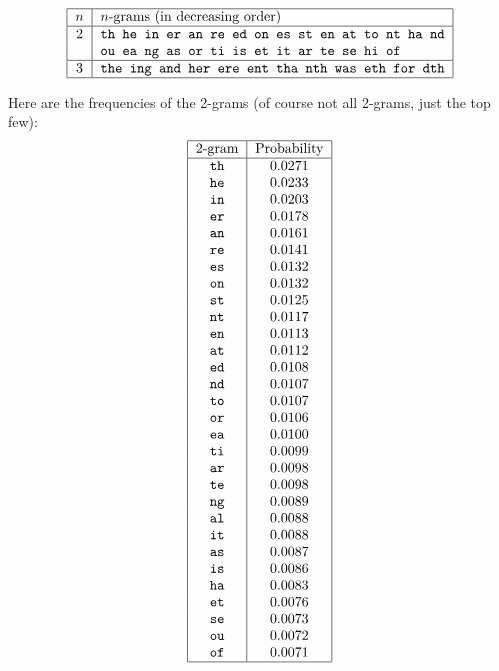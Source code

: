 \[
 \begin{tabular}{|c|l|}
   \hline
   $n$ & $n$-grams (in decreasing order)\\
   \hline
   2 & \texttt{th he in er an re ed on es st en at to nt ha nd} \\
     & \texttt{ou ea ng as or ti is et it ar te se hi of} \\
     \hline
   3 & \texttt{the ing and her ere ent tha nth was eth for dth} \\
   \hline
 \end{tabular}
\]

Here are the frequencies of the 2-grams (of course not all 2-grams, just the
top few):
\[
 \begin{tabular}{|c|c|}
   \hline
   2-gram & Probability \\
   \hline
\texttt{th} &  0.0271\\
\texttt{he} &  0.0233\\
\texttt{in} &  0.0203\\
\texttt{er} &  0.0178\\
\texttt{an} &  0.0161\\
\texttt{re} &  0.0141\\
\texttt{es} &  0.0132\\
\texttt{on} &  0.0132\\
\texttt{st} &  0.0125\\
\texttt{nt} &  0.0117\\
\texttt{en} &  0.0113\\
\texttt{at} &  0.0112\\
\texttt{ed} &  0.0108\\
\texttt{nd} &  0.0107\\
\texttt{to} &  0.0107\\
\texttt{or} &  0.0106\\
\texttt{ea} &  0.0100\\
\texttt{ti} &  0.0099\\
\texttt{ar} &  0.0098\\
\texttt{te} &  0.0098\\
\texttt{ng} &  0.0089\\
\texttt{al} &  0.0088\\
\texttt{it} &  0.0088\\
\texttt{as} &  0.0087\\
\texttt{is} &  0.0086\\
\texttt{ha} &  0.0083\\
\texttt{et} &  0.0076\\
\texttt{se} &  0.0073\\
\texttt{ou} &  0.0072\\
\texttt{of} &  0.0071\\
   \hline
 \end{tabular}
\]

